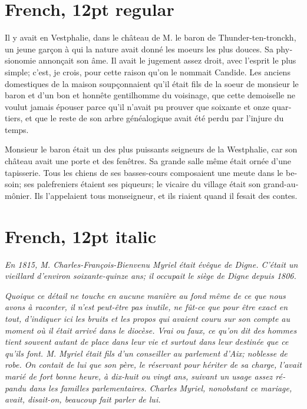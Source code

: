 \documentclass[12pt]{book}
\newcommand{\frit}[1]{\textfrench{\itshape #1}}
\begin{document}
\section*{French, 12pt regular}

\textfrench{Il y avait en Vestphalie, dans le château de M. le baron de
Thunder-ten-tronckh, un jeune garçon à qui la nature avait donné les
moeurs les plus douces. Sa physionomie annonçait son âme. Il avait le
jugement assez droit, avec l’esprit le plus simple; c’est, je crois,
pour cette raison qu’on le nommait Candide. Les anciens domestiques de
la maison soupçonnaient qu’il était fils de la soeur de monsieur le
baron et d’un bon et honnête gentilhomme du voisinage, que cette
demoiselle ne voulut jamais épouser parce qu’il n’avait pu prouver que
soixante et onze quartiers, et que le reste de son arbre généalogique
avait été perdu par l’injure du temps.}

\textfrench{Monsieur le baron était un des plus puissants seigneurs de la
Westphalie, car son château avait une porte et des fenêtres. Sa grande
salle même était ornée d’une tapisserie. Tous les chiens de ses
basses-cours composaient une meute dans le besoin; ses palefreniers
étaient ses piqueurs; le vicaire du village était son
grand-aumônier. Ils l’appelaient tous monseigneur, et ils riaient
quand il fesait des contes.}

\section*{French, 12pt italic}

\frit{En 1815, M. Charles-François-Bienvenu Myriel était évêque de
Digne. C'était un vieillard d'environ soixante-quinze ans; il occupait
le siège de Digne depuis 1806.}

\frit{Quoique ce détail ne touche en aucune manière au fond même de ce que
nous avons à raconter, il n'est peut-être pas inutile, ne fût-ce que
pour être exact en tout, d'indiquer ici les bruits et les propos qui
avaient couru sur son compte au moment où il était arrivé dans le
diocèse. Vrai ou faux, ce qu'on dit des hommes tient souvent autant de
place dans leur vie et surtout dans leur destinée que ce qu'ils
font. M. Myriel était fils d'un conseiller au parlement d'Aix;
noblesse de robe. On contait de lui que son père, le réservant pour
hériter de sa charge, l'avait marié de fort bonne heure, à dix-huit ou
vingt ans, suivant un usage assez répandu dans les familles
parlementaires. Charles Myriel, nonobstant ce mariage, avait,
disait-on, beaucoup fait parler de lui.}
\end{document}
